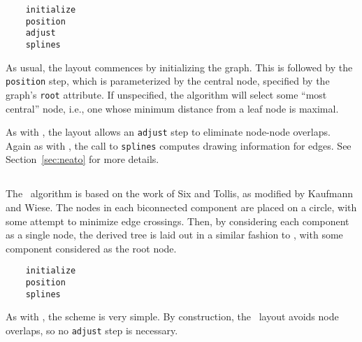 \begin{verbatim}
    initialize
    position
    adjust
    splines
\end{verbatim}

As usual, the layout commences by initializing the graph.
This is followed by the {\tt position} step, which is parameterized
by the central node, specified by the graph's {\tt root} attribute.
If unspecified, the algorithm will select some
``most central'' node, i.e., one whose minimum distance from a leaf
node is maximal.

As with \neato, the layout allows an {\tt adjust} step 
to eliminate node-node overlaps. Again as with \neato, the call to 
{\tt splines} computes drawing information for edges. See
Section~\ref{sec:neato} for more details.

\subsection{\circo}
\label{sec:circo}

The \circo\ algorithm is based on the work of Six and Tollis\cite{st,st2},
as modified by Kaufmann and Wiese\cite{kw}. The nodes in each 
biconnected component are placed on a circle, with some attempt to 
minimize edge crossings. Then, by considering each component as a single
node, the derived tree is laid out in a similar fashion to \twopi,
with some component considered as the root node.

\begin{verbatim}
    initialize
    position
    splines
\end{verbatim}

As with \fdp, the scheme is very simple.
By construction, the \circo\ layout avoids node overlaps, so no
{\tt adjust} step is necessary.

